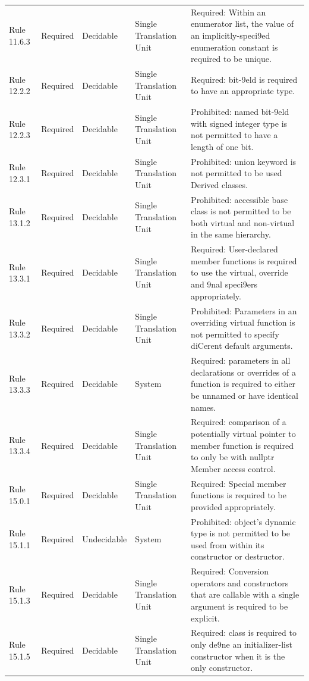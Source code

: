 \documentclass[11pt]{article}
\begin{document}
{\begin{longtable}{@{}P{2.2cm}P{1.7cm}P{2.1cm}P{3.0cm}P{6.7cm}@{}}
Rule 11.6.3 & Required & Decidable & Single Translation Unit & Required: Within an enumerator list, the value of an implicitly-speci9ed enumeration constant is required to be unique. \\
Rule 12.2.2 & Required & Decidable & Single Translation Unit & Required: bit-9eld is required to have an appropriate type. \\
Rule 12.2.3 & Required & Decidable & Single Translation Unit & Prohibited: named bit-9eld with signed integer type is not permitted to have a length of one bit. \\
Rule 12.3.1 & Required & Decidable & Single Translation Unit & Prohibited: union keyword is not permitted to be used Derived classes. \\
Rule 13.1.2 & Required & Decidable & Single Translation Unit & Prohibited: accessible base class is not permitted to be both virtual and non-virtual in the same hierarchy. \\
Rule 13.3.1 & Required & Decidable & Single Translation Unit & Required: User-declared member functions is required to use the virtual, override and 9nal speci9ers appropriately. \\
Rule 13.3.2 & Required & Decidable & Single Translation Unit & Prohibited: Parameters in an overriding virtual function is not permitted to specify diCerent default arguments. \\
Rule 13.3.3 & Required & Decidable & System & Required: parameters in all declarations or overrides of a function is required to either be unnamed or have identical names. \\
Rule 13.3.4 & Required & Decidable & Single Translation Unit & Required: comparison of a potentially virtual pointer to member function is required to only be with nullptr Member access control. \\
Rule 15.0.1 & Required & Decidable & Single Translation Unit & Required: Special member functions is required to be provided appropriately. \\
Rule 15.1.1 & Required & Undecidable & System & Prohibited: object’s dynamic type is not permitted to be used from within its constructor or destructor. \\
Rule 15.1.3 & Required & Decidable & Single Translation Unit & Required: Conversion operators and constructors that are callable with a single argument is required to be explicit. \\
Rule 15.1.5 & Required & Decidable & Single Translation Unit & Required: class is required to only de9ne an initializer-list constructor when it is the only constructor. \\

\end{longtable}}
\end{document}
